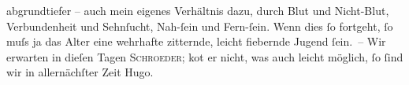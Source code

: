 \begin{ledgroupsized}[t]{13cm}
               abgrundtiefer – auch mein eigenes Verhältnis dazu, durch Blut und Nicht-Blut,
               Verbundenheit und Sehnſucht, Nah-ſein und Fern-ſein. Wenn dies ſo fortgeht, ſo muſs
               ja das Alter eine wehrhafte zitternde, leicht fiebernde Jugend ſein. – Wir erwarten in
               dieſen Tagen \textsc{Schroeder}; ko{\geminationm}t er nicht, was auch leicht möglich, ſo ſind
               wir in allernächſter Zeit \label{T_L02176_1v}\label{T_L02176_1h}\pend
           \pstart \spacefill\mbox{Hugo.}\pend{}
         
         \endnumbering{}\end{ledgroupsized}  \newcommand{\dateiname}{L02176}\newcommand{\titel}{Hugo von Hofmannsthal an Arthur Schnitzler, 16. 4. [1914]}\newcommand{\editorInnen}{Martin Anton Müller und Gerd-Hermann Susen}
      